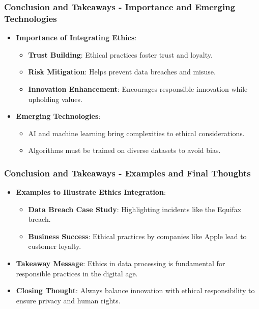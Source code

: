 \documentclass[aspectratio=169]{beamer}
\begin{document}
\begin{frame}[fragile]
    \frametitle{Conclusion and Takeaways - Importance and Emerging Technologies}
    \begin{itemize}
        \item \textbf{Importance of Integrating Ethics}:
        \begin{itemize}
            \item \textbf{Trust Building}: Ethical practices foster trust and loyalty.
            \item \textbf{Risk Mitigation}: Helps prevent data breaches and misuse.
            \item \textbf{Innovation Enhancement}: Encourages responsible innovation while upholding values.
        \end{itemize}

        \item \textbf{Emerging Technologies}:
        \begin{itemize}
            \item AI and machine learning bring complexities to ethical considerations.
            \item Algorithms must be trained on diverse datasets to avoid bias.
        \end{itemize}
    \end{itemize}
\end{frame}

\begin{frame}[fragile]
    \frametitle{Conclusion and Takeaways - Examples and Final Thoughts}
    \begin{itemize}
        \item \textbf{Examples to Illustrate Ethics Integration}:
        \begin{itemize}
            \item \textbf{Data Breach Case Study}: Highlighting incidents like the Equifax breach.
            \item \textbf{Business Success}: Ethical practices by companies like Apple lead to customer loyalty.
        \end{itemize}

        \item \textbf{Takeaway Message}: 
        Ethics in data processing is fundamental for responsible practices in the digital age.

        \item \textbf{Closing Thought}:
        Always balance innovation with ethical responsibility to ensure privacy and human rights.
    \end{itemize}
\end{frame}
\end{document}
